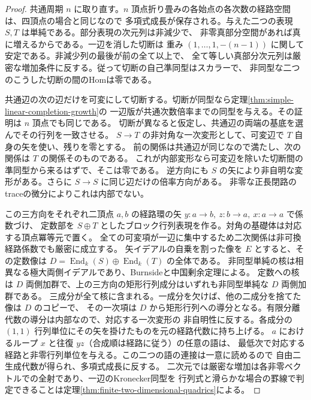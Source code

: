 \begin{proof}
共通周期 $n$ に取り直す。$n$ 頂点折り畳みの各始点の各次数の経路空間は、四頂点の場合と同じなので
多項式成長が保存される。与えた二つの表現 $S,T$ は単純である。部分表現の次元列は非減少で、
非零真部分空間があれば真に増えるからである。一辺を消した切断は
重み $(1,\ldots,1,-(n-1))$ に関して安定である。非減少列の最後が前の全て以上で、
全て等しい真部分次元列は厳密な増加条件に反する。従って切断の自己準同型はスカラーで、
非同型な二つのこうした切断の間のHomは零である。

共通辺の次の辺だけを可変にして切断する。切断が同型なら定理\ref{thm:simple-linear-completion-growth}の
一辺版が共通次数倍率までの同型を与える。その証明は $n$ 頂点でも同じである。
切断が異なると仮定し、共通辺の両端の基底を選んでその行列を一致させる。
$S\to T$ の非対角な一次変形として、可変辺で $T$ 自身の矢を使い、残りを零とする。
前の関係は共通辺が同じなので満たし、次の関係は $T$ の関係そのものである。
これが内部変形なら可変辺を除いた切断間の準同型から来るはずで、そこは零である。
逆方向にも $S$ の矢により非自明な変形がある。さらに $S\to S$ に同じ辺だけの倍率方向がある。
非零な正長閉路のtraceの微分によりこれは内部でない。

この三方向をそれぞれ二頂点 $a,b$ の経路環の矢 $y:a\to b,\ z:b\to a,\ x:a\to a$ で係数づけ、
定数部を $S\oplus T$ としたブロック行列表現を作る。対角の基礎体は対応する頂点冪等元で置く。
全ての可変項が一辺に集中するため二次関係は非可換経路係数でも厳密に成立する。
矢イデアルの自乗を割った像を $E$ とすると、その定数像は
$D=\operatorname{End}_k(S)\oplus\operatorname{End}_k(T)$ の全体である。
非同型単純の核は相異なる極大両側イデアルであり、Burnsideと中国剰余定理による。
定数への核は $D$ 両側加群で、上の三方向の矩形行列成分はいずれも非同型単純な $D$ 両側加群である。
三成分が全て核に含まれる。一成分を欠けば、他の二成分を捨てた像は $D$ のコピーで、
その一次項は $D$ から矩形行列への導分となる。有限分離代数の導分は内部なので、対応する一次変形の
非自明性に反する。各成分の $(1,1)$ 行列単位にその矢を掛けたものを元の経路代数に持ち上げる。
$a$ におけるループ $x$ と往復 $yz$（合成順は経路に従う）の任意の語は、
最低次で対応する経路と非零行列単位を与える。この二つの語の連接は一意に読めるので
自由二生成代数が得られ、多項式成長に反する。
二次元では厳密な増加は各非零ベクトルでの全射であり、一辺のKronecker同型を
行列式と滑らかな場合の罫線で判定できることは定理\ref{thm:finite-two-dimensional-quadrics}による。
\end{proof}

